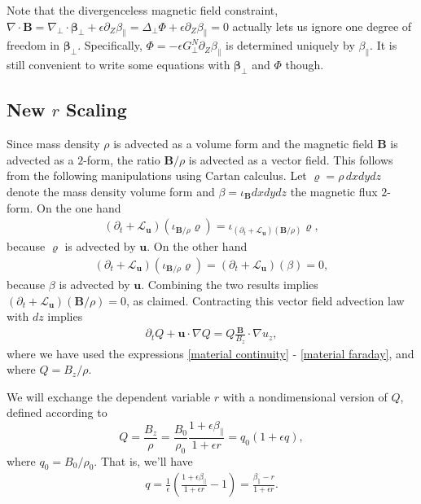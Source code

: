 \documentclass{article}
\newcommand{\para}{\parallel}
\newcommand{\ep}{\epsilon}
\newcommand{\np}{\nabla_\perp}
\newcommand{\lap}{\Delta_\perp}
\newcommand{\p}{\partial}
\newcommand{\GN}{G_\perp^N}
\newcommand{\pth} [1] {\left( #1 \right) }
\begin{document}
Note that the divergenceless magnetic field constraint, $\nabla\cdot\bm{B} = \np\cdot\bm{\beta}_\perp + \ep\p_Z\beta_\para = \lap\Phi + \ep\p_Z\beta_\para = 0$ actually lets us ignore one degree of freedom in $\bm{\beta}_\perp$. Specifically, $\Phi = -\ep\GN\p_Z\beta_\para$ is determined uniquely by $\beta_\para$. It is still convenient to write some equations with $\bm{\beta}_\perp$ and $\Phi$ though. 


\subsection{New $r$ Scaling}
Since mass density $\rho$ is advected as a volume form and the magnetic field $\bm{B}$ is advected as a $2$-form, the ratio $\bm{B}/\rho$ is advected as a vector field. This follows from the following manipulations using Cartan calculus. Let $\varrho = \rho\,dxdydz$ denote the mass density volume form and $\beta = \iota_{\bm{B}}dxdydz$ the magnetic flux $2$-form. On the one hand
\begin{align*}
(\partial_t + \mathcal{L}_{\bm{u}})(\iota_{\bm{B}/\rho}\varrho) = \iota_{(\partial_t + \mathcal{L}_{\bm{u}})(\bm{B}/\rho)}\varrho,
\end{align*}
because $\varrho$ is advected by $\bm{u}$. On the other hand 
\begin{align*}
(\partial_t + \mathcal{L}_{\bm{u}})(\iota_{\bm{B}/\rho}\varrho) = (\partial_t + \mathcal{L}_{\bm{u}})(\beta) = 0,
\end{align*}
because $\beta$ is advected by $\bm{u}$. Combining the two results implies $(\partial_t + \mathcal{L}_{\bm{u}})(\bm{B}/\rho) = 0$, as claimed. Contracting this vector field advection law with $dz$ implies 
\begin{align} \label{Qevolution}
\partial_tQ + \bm{u}\cdot\nabla Q = Q\frac{\bm{B}}{B_z}\cdot\nabla u_z,
\end{align}
where we have used the expressions \eqref{material continuity} - \eqref{material faraday}, and where $Q = B_z/\rho$.

We will exchange the dependent variable $r$ with a nondimensional version of $Q$, defined according to 
\begin{equation} 
    Q = \frac{B_z}{\rho} = \frac{B_0}{\rho_0} \frac{1+\ep\beta_\para}{1+\ep r} = q_0 (1+\ep q), 
\end{equation}
where $q_0 = B_0/\rho_0$. That is, we'll have 
\begin{align} \label{qdefinition}
    q = \frac{1}{\ep} \pth{\frac{1+\ep\beta_\para}{1+\ep r} - 1} = \frac{\beta_\para - r}{1+\ep r}.
\end{align}
\end{document}
